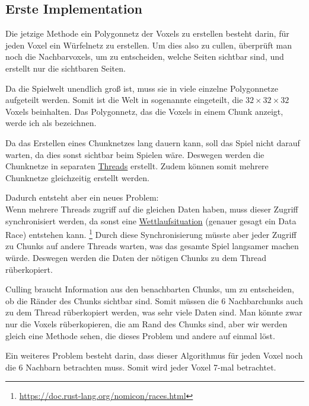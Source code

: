\subsection{Erste Implementation}

Die jetzige Methode ein Polygonnetz der Voxels
zu erstellen besteht darin, für jeden Voxel
ein Würfelnetz zu erstellen.
Um dies also zu cullen, überprüft man
noch die Nachbarvoxels, um zu entscheiden,
welche Seiten sichtbar sind, und erstellt nur
die sichtbaren Seiten.


Da die Spielwelt unendlich groß ist, muss sie
in viele einzelne Polygonnetze aufgeteilt werden.
Somit ist die Welt in sogenannte 
eingeteilt, die $32 \times 32 \times 32$ Voxels
beinhalten. Das Polygonnetz, das die Voxels in einem
Chunk anzeigt, werde ich als
 bezeichnen.


Da das Erstellen eines Chunknetzes lang dauern kann,
soll das Spiel nicht darauf warten,
da dies sonst sichtbar beim Spielen wäre.
Deswegen werden die Chunknetze in separaten
\href{https://de.wikipedia.org/wiki/Thread_(Informatik)}{Threads}
erstellt.
Zudem können somit mehrere Chunknetze gleichzeitig
erstellt werden.

\vspace{0.3cm}



\vspace{0.3cm}

Dadurch entsteht aber ein neues Problem: \\
Wenn mehrere Threads zugriff auf die gleichen Daten
haben, muss dieser Zugriff synchronisiert werden,
da sonst eine
\href{https://de.wikipedia.org/wiki/Wettlaufsituation}{Wettlaufsituation}
(genauer gesagt ein Data Race) entstehen kann.
\footnote{\url{https://doc.rust-lang.org/nomicon/races.html}}
Durch diese Synchronisierung müsste aber jeder Zugriff
zu Chunks auf andere Threads warten, was das gesamte
Spiel langsamer machen würde. Deswegen werden die
Daten der nötigen Chunks zu dem Thread rüberkopiert.

Culling braucht Information aus den benachbarten
Chunks, um zu entscheiden, ob die Ränder des Chunks
sichtbar sind. Somit müssen die 6 Nachbarchunks
auch zu dem Thread rüberkopiert werden, was sehr viele
Daten sind. Man könnte zwar nur die Voxels
rüberkopieren, die am Rand des Chunks sind,
aber wir werden gleich eine Methode sehen,
die dieses Problem und andere auf einmal löst.

\vspace{0.3cm}

Ein weiteres Problem besteht darin, dass dieser
Algorithmus für jeden Voxel noch die 6 Nachbarn
betrachten muss. Somit wird jeder Voxel 7-mal
betrachtet.
